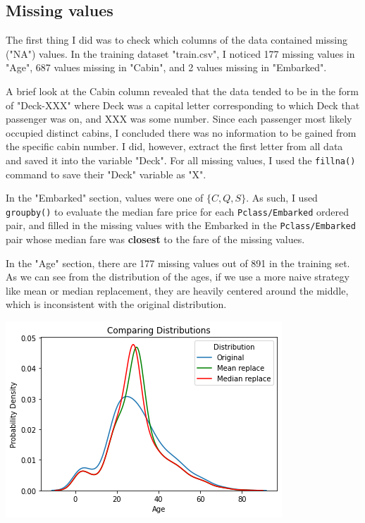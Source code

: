 \documentclass[12pt]{article}
\begin{document}
\subsection{Missing values}

The first thing I did was to check which columns of the data contained missing ("NA") values. In the training dataset "train.csv", I noticed 177 missing values in "Age", 687 values missing in "Cabin", and 2 values missing in "Embarked".\newline

A brief look at the Cabin column revealed that the data tended to be in the form of "Deck-XXX" where Deck was a capital letter corresponding to which Deck that passenger was on, and XXX was some number. Since each passenger most likely occupied distinct cabins, I concluded there was no information to be gained from the specific cabin number. I did, however, extract the first letter from all data and saved it into the variable "Deck". For all missing values, I used the \texttt{fillna()} command to save their "Deck" variable as "X".\newline

In the "Embarked" section, values were one of $\{C,Q,S\}$. As such, I used \texttt{groupby()} to evaluate the median fare price for each \texttt{Pclass/Embarked} ordered pair, and filled in the missing values with the Embarked in the \texttt{Pclass/Embarked} pair whose median fare was \textbf{closest} to the fare of the missing values.\newline

In the "Age" section, there are 177 missing values out of 891 in the training set. As we can see from the distribution of the ages, if we use a more naive strategy like mean or median replacement, they are heavily centered around the middle, which is inconsistent with the original distribution.\newline

\includegraphics[scale=0.6]{age_distributions}
\end{document}
